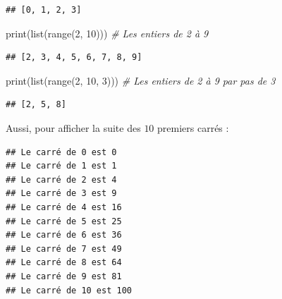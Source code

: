 \documentclass[12pt,]{book}
\newenvironment{Shaded}{\begin{snugshade}}{\end{snugshade}}
\newcommand{\KeywordTok}[1]{\textcolor[rgb]{0.13,0.29,0.53}{\textbf{#1}}}
\newcommand{\DecValTok}[1]{\textcolor[rgb]{0.00,0.00,0.81}{#1}}
\newcommand{\SpecialCharTok}[1]{\textcolor[rgb]{0.00,0.00,0.00}{#1}}
\newcommand{\StringTok}[1]{\textcolor[rgb]{0.31,0.60,0.02}{#1}}
\newcommand{\CommentTok}[1]{\textcolor[rgb]{0.56,0.35,0.01}{\textit{#1}}}
\newcommand{\ControlFlowTok}[1]{\textcolor[rgb]{0.13,0.29,0.53}{\textbf{#1}}}
\newcommand{\OperatorTok}[1]{\textcolor[rgb]{0.81,0.36,0.00}{\textbf{#1}}}
\newcommand{\BuiltInTok}[1]{#1}
\newcommand{\NormalTok}[1]{#1}
\numberwithin{equation}{section}
\numberwithin{countremarque}{section}
\begin{document}
\begin{lstlisting}
## [0, 1, 2, 3]
\end{lstlisting}

\begin{Shaded}
\begin{Highlighting}[]
\BuiltInTok{print}\NormalTok{(}\BuiltInTok{list}\NormalTok{(}\BuiltInTok{range}\NormalTok{(}\DecValTok{2}\NormalTok{, }\DecValTok{10}\NormalTok{))) }\CommentTok{# Les entiers de 2 à 9}
\end{Highlighting}
\end{Shaded}

\begin{lstlisting}
## [2, 3, 4, 5, 6, 7, 8, 9]
\end{lstlisting}

\begin{Shaded}
\begin{Highlighting}[]
\BuiltInTok{print}\NormalTok{(}\BuiltInTok{list}\NormalTok{(}\BuiltInTok{range}\NormalTok{(}\DecValTok{2}\NormalTok{, }\DecValTok{10}\NormalTok{, }\DecValTok{3}\NormalTok{))) }\CommentTok{# Les entiers de 2 à 9 par pas de 3}
\end{Highlighting}
\end{Shaded}

\begin{lstlisting}
## [2, 5, 8]
\end{lstlisting}

Aussi, pour afficher la suite des \(10\) premiers carrés :

\begin{Shaded}
\end{Shaded}

\begin{lstlisting}
## Le carré de 0 est 0
## Le carré de 1 est 1
## Le carré de 2 est 4
## Le carré de 3 est 9
## Le carré de 4 est 16
## Le carré de 5 est 25
## Le carré de 6 est 36
## Le carré de 7 est 49
## Le carré de 8 est 64
## Le carré de 9 est 81
## Le carré de 10 est 100
\end{lstlisting}
\end{document}

